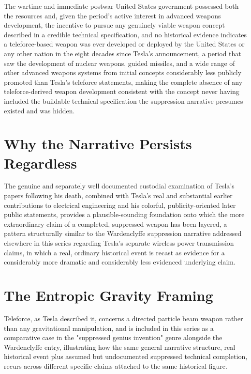 \documentclass[11pt]{article}
\begin{document}
The wartime and immediate postwar United States government possessed both the resources and, given the period's active interest in advanced weapons development, the incentive to pursue any genuinely viable weapon concept described in a credible technical specification, and no historical evidence indicates a teleforce-based weapon was ever developed or deployed by the United States or any other nation in the eight decades since Tesla's announcement, a period that saw the development of nuclear weapons, guided missiles, and a wide range of other advanced weapons systems from initial concepts considerably less publicly promoted than Tesla's teleforce statements, making the complete absence of any teleforce-derived weapon development consistent with the concept never having included the buildable technical specification the suppression narrative presumes existed and was hidden.

\section{Why the Narrative Persists Regardless}

The genuine and separately well documented custodial examination of Tesla's papers following his death, combined with Tesla's real and substantial earlier contributions to electrical engineering and his colorful, publicity-oriented later public statements, provides a plausible-sounding foundation onto which the more extraordinary claim of a completed, suppressed weapon has been layered, a pattern structurally similar to the Wardenclyffe suppression narrative addressed elsewhere in this series regarding Tesla's separate wireless power transmission claims, in which a real, ordinary historical event is recast as evidence for a considerably more dramatic and considerably less evidenced underlying claim.

\section{The Entropic Gravity Framing}

Teleforce, as Tesla described it, concerns a directed particle beam weapon rather than any gravitational manipulation, and is included in this series as a comparative case in the "suppressed genius invention" genre alongside the Wardenclyffe entry, illustrating how the same general narrative structure, real historical event plus assumed but undocumented suppressed technical completion, recurs across different specific claims attached to the same historical figure.
\end{document}
